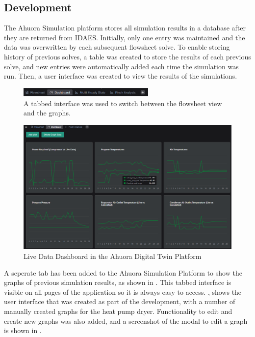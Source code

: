 \subsection{Development} \label{sec:recordinghistorydevelopment}

The Ahuora Simulation platform stores all simulation results in a database after they are returned from IDAES. Initially, only one entry was maintained and the data was overwritten by each subsequent flowsheet solve. To enable storing history of previous solves, a table was created to store the results of each previous solve, and new entries were automatically added each time the simulation was run. Then, a user interface was created to view the results of the simulations.


\begin{figure}[h]
    \centering
    \includegraphics[width=0.6\textwidth]{tabs.png}
    \caption{A tabbed interface was used to switch between the flowsheet view and the graphs.}
    \label{fig:tabbed_interface}
\end{figure}

\begin{figure}[h]
    \centering
    \includegraphics[width=\textwidth]{livedatadashboard.png}
    \caption{Live Data Dashboard in the Ahuora Digital Twin Platform}
    \label{fig:livedatadashboard}
\end{figure}

A seperate tab has been added to the Ahuora Simulation Platform to show the graphs of previous simulation results, as shown in . This tabbed interface is visible on all pages of the application so it is always easy to access. , shows the user interface that was created as part of the development, with a number of manually created graphs for the heat pump dryer. Functionality to edit and create new graphs was also added, and a screenshot of the modal to edit a graph is shown in .

